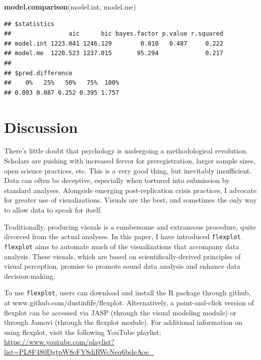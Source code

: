 \documentclass[
  man]{apa6}
\newenvironment{Shaded}{\begin{snugshade}}{\end{snugshade}}
\newcommand{\KeywordTok}[1]{\textcolor[rgb]{0.13,0.29,0.53}{\textbf{#1}}}
\newcommand{\NormalTok}[1]{#1}
\begin{document}
\begin{Shaded}
\begin{Highlighting}[]
\KeywordTok{model.comparison}\NormalTok{(model.int, model.me)}
\end{Highlighting}
\end{Shaded}

\begin{verbatim}
## $statistics
##                aic      bic bayes.factor p.value r.squared
## model.int 1223.041 1246.129        0.010   0.487     0.222
## model.me  1220.523 1237.015       95.294             0.217
## 
## $pred.difference
##    0%   25%   50%   75%  100% 
## 0.003 0.087 0.252 0.395 1.757
\end{verbatim}

\hypertarget{discussion}{%
\section{Discussion}\label{discussion}}

There's little doubt that psychology is undergoing a methodological revolution. Scholars are pushing with increased fervor for preregistration, larger sample sizes, open science practices, etc. This is a very good thing, but inevitably insufficient. Data can often be deceptive, especially when tortured into submission by standard analyses. Alongside emerging post-replication crisis practices, I advocate for greater use of visualizations. Visuals are the best, and sometimes the only way to allow data to speak for itself.

Traditionally, producing visuals is a cumbersome and extraneous procedure, quite divorced from the actual analyses. In this paper, I have introduced \texttt{flexplot}. \texttt{flexplot} aims to automate much of the visualizations that accompany data analysis. These visuals, which are based on scientifically-derived principles of visual perception, promise to promote sound data analysis and enhance data decision-making.

To use \texttt{flexplot}, users can download and install the R package through github, at www.github.com/dustinfife/flexplot. Alternatively, a point-and-click version of flexplot can be accessed via JASP (through the visual modeling module) or through Jamovi (through the flexplot module). For additional information on using flexplot, visit the following YouTube playlist: \url{https://www.youtube.com/playlist?list=PL8F480DgtpW8cFY8diRWcNeq6bsleAoe_}

\newpage
\end{document}
